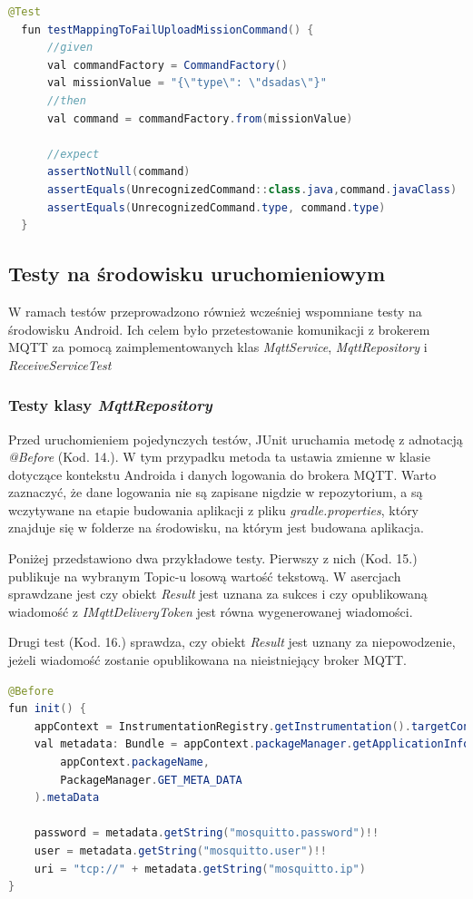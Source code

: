 \begin{lstlisting}[language=Java, caption=Test tworzenia komendy \textit{UnrecognizedCommand}]
  @Test
  fun testMappingToFailUploadMissionCommand() {
      //given
      val commandFactory = CommandFactory()
      val missionValue = "{\"type\": \"dsadas\"}"
      //then
      val command = commandFactory.from(missionValue)

      //expect
      assertNotNull(command)
      assertEquals(UnrecognizedCommand::class.java,command.javaClass)
      assertEquals(UnrecognizedCommand.type, command.type)
  }
\end{lstlisting}

\subsection{Testy na środowisku uruchomieniowym}
W ramach testów przeprowadzono również wcześniej wspomniane testy na środowisku Android. Ich celem było przetestowanie komunikacji z brokerem MQTT za pomocą zaimplementowanych klas \textit{MqttService}, \textit{MqttRepository} i \textit{ReceiveServiceTest}

\subsubsection{Testy klasy \textit{MqttRepository}}
Przed uruchomieniem pojedynczych testów, JUnit uruchamia metodę z adnotacją \textit{@Before} (Kod. 14.). W tym przypadku metoda ta ustawia zmienne w klasie dotyczące kontekstu Androida i danych logowania do brokera MQTT. Warto zaznaczyć, że dane logowania nie są zapisane nigdzie w repozytorium, a są wczytywane na etapie budowania aplikacji z pliku \textit{gradle.properties}, który znajduje się w folderze na środowisku, na którym jest budowana aplikacja.

Poniżej przedstawiono dwa przykładowe testy. Pierwszy z nich (Kod. 15.) publikuje na wybranym Topic-u losową wartość tekstową. W asercjach sprawdzane jest czy obiekt \textit{Result} jest uznana za sukces i czy opublikowaną wiadomość z \textit{IMqttDeliveryToken} jest równa wygenerowanej wiadomości.

Drugi test (Kod. 16.) sprawdza, czy obiekt \textit{Result} jest uznany za niepowodzenie, jeżeli wiadomość zostanie opublikowana na nieistniejący broker MQTT.


\newpage
\begin{lstlisting}[language=Java, caption=Inicjalizowanie wartosci dla wszystkich testów w \textit{MqttRepositoryTest}]
@Before
fun init() {
    appContext = InstrumentationRegistry.getInstrumentation().targetContext
    val metadata: Bundle = appContext.packageManager.getApplicationInfo(
        appContext.packageName,
        PackageManager.GET_META_DATA
    ).metaData

    password = metadata.getString("mosquitto.password")!!
    user = metadata.getString("mosquitto.user")!!
    uri = "tcp://" + metadata.getString("mosquitto.ip")
}
\end{lstlisting}

